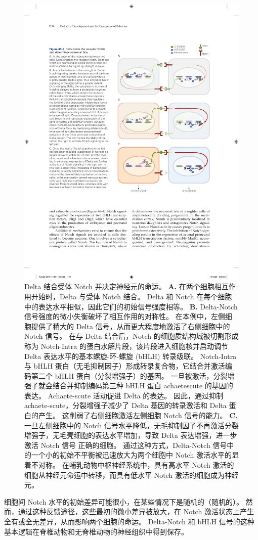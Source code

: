 \begin{figure}[htbp]
	\centering
	\includegraphics[width=0.65\linewidth]{chap46/fig_46_3}
	\caption{Delta 结合受体 Notch 并决定神经元的命运。
		\textbf{A.} 在两个细胞相互作用开始时，Delta 与受体 Notch 结合。
		Delta 和 Notch 在每个细胞中的表达水平相似，因此它们的初始信号强度相等。
		\textbf{B.} Delta-Notch 信号强度的微小失衡破坏了相互作用的对称性。
		在本例中，左侧细胞提供了稍大的 Delta 信号，从而更大程度地激活了右侧细胞中的 Notch 信号。
		在与 Delta 结合后，Notch 的细胞质结构域被切割形成称为 Notch-Intra 的蛋白水解片段，该片段进入细胞核并启动调节 Delta 表达水平的基本螺旋-环-螺旋 (bHLH) 转录级联。
		Notch-Intra 与 bHLH 蛋白（无毛抑制因子）形成转录复合物，它结合并激活编码第二个 bHLH 蛋白（分裂增强子）的基因。
		一旦被激活，分裂增强子就会结合并抑制编码第三种 bHLH 蛋白 achaetescute 的基因的表达。
		Achaete-scute 活动促进 Delta 的表达。
		因此，通过抑制 achaete-scute，分裂增强子减少了 Delta 基因的转录激活和 Delta 蛋白的产生。
		这削弱了右侧细胞激活左侧细胞 Notch 信号的能力。
		\textbf{C.} 一旦左侧细胞中的 Notch 信号水平降低，无毛抑制因子不再激活分裂增强子，无毛壳细胞的表达水平增加，导致 Delta 表达增强，进一步激活 Notch 信号 正确的细胞。
		通过这种方式，Delta-Notch 信号中的一个小的初始不平衡被迅速放大为两个细胞中 Notch 激活水平的显着不对称。
		在哺乳动物中枢神经系统中，具有高水平 Notch 激活的细胞从神经元命运中转移，而具有低水平 Notch 激活的细胞成为神经元。}
	\label{fig:46_3}
\end{figure}


细胞间 Notch 水平的初始差异可能很小，在某些情况下是随机的（随机的）。
然而，通过这种反馈途径，这些最初的微小差异被放大，在 Notch 激活状态上产生全有或全无差异，从而影响两个细胞的命运。
Delta-Notch 和 bHLH 信号的这种基本逻辑在脊椎动物和无脊椎动物的神经组织中得到保存。


